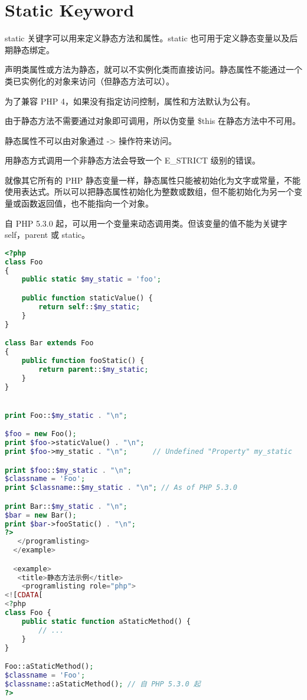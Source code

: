 \chapter{Static Keyword}

static 关键字可以用来定义静态方法和属性。static 也可用于定义静态变量以及后期静态绑定。

声明类属性或方法为静态，就可以不实例化类而直接访问。静态属性不能通过一个类已实例化的对象来访问（但静态方法可以）。

为了兼容 PHP 4，如果没有指定访问控制，属性和方法默认为公有。

由于静态方法不需要通过对象即可调用，所以伪变量 \$this 在静态方法中不可用。

静态属性不可以由对象通过 -\/> 操作符来访问。

用静态方式调用一个非静态方法会导致一个 E\_STRICT 级别的错误。

就像其它所有的 PHP 静态变量一样，静态属性只能被初始化为文字或常量，不能使用表达式。所以可以把静态属性初始化为整数或数组，但不能初始化为另一个变量或函数返回值，也不能指向一个对象。

自 PHP 5.3.0 起，可以用一个变量来动态调用类。但该变量的值不能为关键字 self，parent 或 static。


\begin{lstlisting}[language=PHP]
<?php
class Foo
{
    public static $my_static = 'foo';

    public function staticValue() {
        return self::$my_static;
    }
}

class Bar extends Foo
{
    public function fooStatic() {
        return parent::$my_static;
    }
}


print Foo::$my_static . "\n";

$foo = new Foo();
print $foo->staticValue() . "\n";
print $foo->my_static . "\n";      // Undefined "Property" my_static 

print $foo::$my_static . "\n";
$classname = 'Foo';
print $classname::$my_static . "\n"; // As of PHP 5.3.0

print Bar::$my_static . "\n";
$bar = new Bar();
print $bar->fooStatic() . "\n";
?>
   </programlisting>
  </example>

  <example>
   <title>静态方法示例</title>
    <programlisting role="php">
<![CDATA[
<?php
class Foo {
    public static function aStaticMethod() {
        // ...
    }
}

Foo::aStaticMethod();
$classname = 'Foo';
$classname::aStaticMethod(); // 自 PHP 5.3.0 起
?>
\end{lstlisting}


